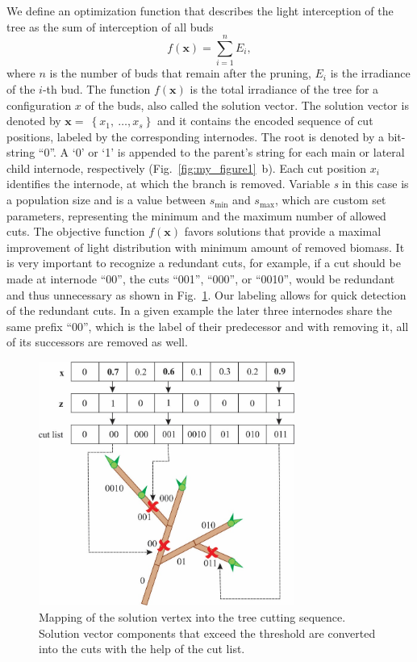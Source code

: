 We define an optimization function that describes the light interception
of the tree as the sum of interception of all buds
\begin{equation}
   f\left( \mathbf{x} \right) = \sum_{i = 1}^{n}E_{i},
\end{equation}
where $n$ is the number of buds that remain after the pruning,
$E_{i}$ is the irradiance of the \(i\)-th bud. The function $f(\mathbf{x})$ is the total irradiance of the tree for a configuration \(x\) of the buds,
also called the solution vector. The solution vector is denoted by
\(\mathbf{x} = \ \left\{ x_{1},\ \ldots,x_{s} \right\}\) and it contains
the encoded sequence of cut positions, labeled by the corresponding
internodes. The root is denoted by a bit-string ``0''. A `0' or `1' is
appended to the parent's string for each main or lateral child
internode, respectively (Fig.~\ref{fig:my_figure1}~b). Each cut position \(x_{i}\)
identifies the internode, at which the branch is removed. Variable
\emph{s} in this case is a population size and is a value between
\(s_{\mathrm{\min}}\) and \(s_{\mathrm{\max}}\), which are custom set
parameters, representing the minimum and the maximum number of allowed
cuts. The objective function \(f(\mathbf{x})\) favors solutions that
provide a maximal improvement of light distribution with minimum amount
of removed biomass. It is very important to recognize a redundant cuts,
for example, if a cut should be made at internode ``00'', the cuts
``001'', ``000'', or ``0010'', would be redundant and thus unnecessary
as shown in Fig.~\ref{fig:my_figure2}. Our labeling allows for quick detection of the
redundant cuts. In a given example the later three internodes share the
same prefix ``00'', which is the label of their predecessor and with
removing it, all of its successors are removed as well.

\begin{figure}[hbt]
    \centering
    \includegraphics[width=3.3in]{figs/image2.jpeg}
    \caption{Mapping of the solution vertex into the tree cutting
sequence. Solution vector components that exceed the threshold are
converted into the cuts with the help of the cut list.}
    \label{fig:my_figure2}
\end{figure}


